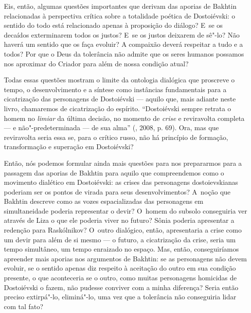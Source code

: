 Eis, então, algumas questões importantes que derivam das aporias de
Bakhtin relacionadas à perspectiva crítica sobre a totalidade poética de
Dostoiévski: o sentido do todo está relacionado apenas à proposição do
diálogo? E~se os decaídos exterminarem todos os justos? E~se os justos
deixarem de sê"-lo? Não haverá um sentido que os faça evoluir? A
compaixão deverá respeitar a tudo e a todos? Por que o Deus da
tolerância não admite que os seres humanos possamos nos aproximar do
Criador para além de nossa condição atual?

Todas essas questões mostram o limite da ontologia dialógica que
proscreve o tempo, o desenvolvimento e a síntese como instâncias
fundamentais para a cicatrização das personagens de Dostoiévski ---
aquilo que, mais adiante neste livro, chamaremos de cicatrização do
espírito. ``Dostoiévski sempre retrata o homem no \emph{limiar} da
última decisão, no momento de \emph{crise} e reviravolta completa --- e
não"-predeterminada --- de sua alma'' (, 2008, p. 69). Ora, mas que
reviravolta seria essa se, para o crítico russo, não há princípio de
formação, transformação e superação em Dostoiévski?

Então, nós podemos formular ainda mais questões para nos prepararmos
para a passagem das aporias de Bakhtin para aquilo que compreendemos
como o movimento dialético em Dostoiévski: as crises das personagens
dostoievskianas poderiam ser os pontos de virada para seus
desenvolvimentos? A~noção que Bakhtin descreve como as vozes
espacializadas das personagens em simultaneidade poderia representar o
devir? O~homem do subsolo conseguiria ver através de Liza o que ele
poderia viver no futuro? Sônia poderia apresentar a redenção para
Raskólnikov? O~outro dialógico, então, apresentaria a crise como um
devir para além de si mesmo --- o futuro, a cicatrização da crise, seria
um tempo simultâneo, um tempo enraizado no espaço. Mas, então,
conseguiríamos apreender mais aporias nos argumentos de Bakhtin: se as
personagens não devem evoluir, se o sentido apenas diz respeito à
aceitação do outro em sua condição presente, o que aconteceria se o
outro, como muitas personagens homicidas de Dostoiévski o fazem, não
pudesse conviver com a minha diferença? Seria então preciso extirpá"-lo,
eliminá"-lo, uma vez que a tolerância não conseguiria lidar com tal fato?

